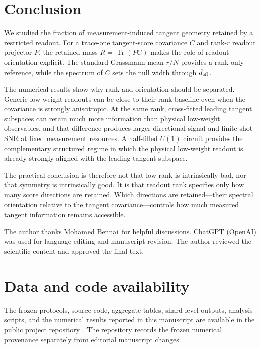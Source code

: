 \documentclass[aps,prx,reprint,superscriptaddress,nofootinbib,longbibliography]{revtex4-2}
\newcommand{\Tr}{\operatorname{Tr}}
\newcommand{\deff}{d_{\rm eff}}
\begin{document}
\section{Conclusion}

We studied the fraction of measurement-induced tangent geometry retained by a restricted readout. For a trace-one tangent-score covariance $C$ and rank-$r$ readout projector $P$, the retained mass $R=\Tr(PC)$ makes the role of readout orientation explicit. The standard Grassmann mean $r/N$ provides a rank-only reference, while the spectrum of $C$ sets the null width through $\deff$.

The numerical results show why rank and orientation should be separated. Generic low-weight readouts can be close to their rank baseline even when the covariance is strongly anisotropic. At the same rank, cross-fitted leading tangent subspaces can retain much more information than physical low-weight observables, and that difference produces larger directional signal and finite-shot SNR at fixed measurement resources. A half-filled $U(1)$ circuit provides the complementary structured regime in which the physical low-weight readout is already strongly aligned with the leading tangent subspace.

The practical conclusion is therefore not that low rank is intrinsically bad, nor that symmetry is intrinsically good. It is that readout rank specifies only how many score directions are retained. Which directions are retained---their spectral orientation relative to the tangent covariance---controls how much measured tangent information remains accessible.

\begin{acknowledgments}
The author thanks Mohamed Bennai\, for helpful discussions. ChatGPT (OpenAI) was used for language editing and manuscript revision. The author reviewed the scientific content and approved the final text.
\end{acknowledgments}

\section*{Data and code availability}
The frozen protocols, source code, aggregate tables, shard-level outputs, analysis scripts, and the numerical results reported in this manuscript are available in the public project repository \cite{AitHaddou2026MeasurementAccessible}. The repository records the frozen numerical provenance separately from editorial manuscript changes.
\end{document}

